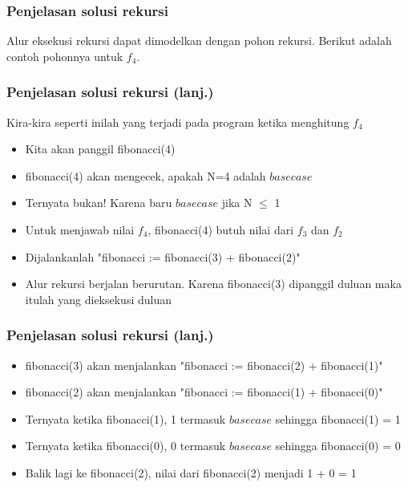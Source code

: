 \documentclass{beamer}
\begin{document}
\begin{frame}[fragile]
\frametitle{Penjelasan solusi rekursi}
Alur eksekusi rekursi dapat dimodelkan dengan pohon rekursi. Berikut adalah contoh pohonnya untuk $f_4$.
\end{frame}

\begin{frame}
\frametitle{Penjelasan solusi rekursi (lanj.)}
Kira-kira seperti inilah yang terjadi pada program ketika menghitung $f_4$
\begin {itemize}
    \item Kita akan panggil fibonacci(4)
    \item fibonacci(4) akan mengecek, apakah N=4 adalah $base case$
    \item Ternyata bukan! Karena baru $base case$ jika N $\le$ 1
    \item Untuk menjawab nilai $f_4$, fibonacci(4)  butuh nilai dari $f_3$ dan $f_2$
    \item Dijalankanlah "fibonacci := fibonacci(3) + fibonacci(2)"
    \item Alur rekursi berjalan berurutan. Karena fibonacci(3) dipanggil duluan maka itulah yang dieksekusi duluan
\end{itemize}
\end{frame}

\begin{frame}
\frametitle{Penjelasan solusi rekursi (lanj.)}
\begin {itemize}
    \item fibonacci(3) akan menjalankan "fibonacci := fibonacci(2) + fibonacci(1)"
    \item fibonacci(2) akan menjalankan "fibonacci := fibonacci(1) + fibonacci(0)"
    \item Ternyata ketika fibonacci(1), 1 termasuk $base case$ sehingga fibonacci(1) = 1
    \item Ternyata ketika fibonacci(0), 0 termasuk $base case$ sehingga fibonacci(0) = 0
    \item Balik lagi ke fibonacci(2), nilai dari fibonacci(2) menjadi 1 + 0 = 1
\end{itemize}
\end{frame}
\end{document}
